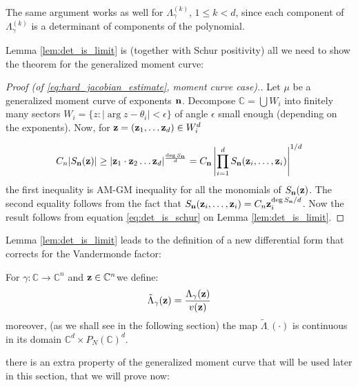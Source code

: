 	\begin{remark}
		The same argument works as well for $\Lambda^{(k)}_\gamma$, $1\le k<d$, since each component of $\Lambda^{(k)}_\gamma$ is a determinant of components of the polynomial.
	\end{remark}

	Lemma \ref{lem:det_is_limit} is (together with Schur positivity) all we need to show the theorem for the generalized moment curve: 

	\begin{proof}
		[Proof (of \eqref{eq:hard_jacobian_estimate}, moment curve case).]

		Let $\mu$ be a generalized moment curve of exponents ${\bf n}$. Decompose $\mathbb C = \bigcup W_i$ into finitely many sectors $W_i = \{z: |\arg z - \theta_i|<\epsilon \}$ of angle $\epsilon$ small enough (depending on the exponents). Now, for ${\bf z} = ({\bf z}_1, \dots {\bf z}_d) \in W_i^d$

		\begin{equation}
			 C_n |S_{\bf n}({\bf z})| 
			 \ge
			 |{\bf z}_1\cdot {\bf z}_2  \dots {\bf z}_d|^{\frac{\deg S_{\bf n}}{d}}
			 = C_{\bf n} \left|\prod_{i=1}^d S_{\bf n}({\bf z}_i, \dots , {\bf z}_i) \right|^{1/d}
		\end{equation}
		the first inequality is AM-GM inequality for all the monomials of $S_{\bf n}({\bf z})$. The second equality follows from the fact that $ S_{{\bf n}}({\bf z}_i, \dots , {\bf z}_i) = C_n {\bf z}_i^{{\deg S_{{\bf n}}}/{d}}$. Now the result follows from equation \eqref{eq:det_is_schur} on Lemma \ref{lem:det_is_limit}.
	\end{proof}

	Lemma \ref{lem:det_is_limit} leads to the definition of a new differential form that corrects for the Vandermonde factor:

	\begin{defi}
		For $\gamma:\mathbb C \to \mathbb C^n$ and ${\bf z} \in \mathbb C^n$we define:
		\begin{equation}
			\tilde \Lambda_\gamma({\bf z}) = 
			\frac
			{\Lambda_\gamma({\bf z}) }
			{v({\bf z}) }
		\end{equation}
		moreover, (as we shall see in the following section) the map ${\tilde\Lambda}_{\cdot}(\cdot)$ is continuous in its domain $ \mathbb C^d \times P_N(\mathbb C)^d$.
	\end{defi}

	there is an extra property of the generalized moment curve that will be used later in this section, that we will prove now: \\

